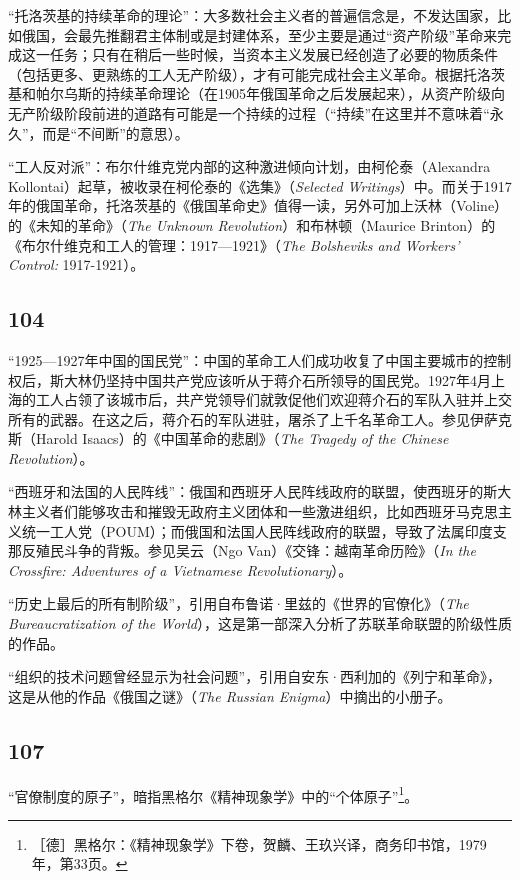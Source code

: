 \documentclass[fontset=fandol, a4paper, 12pt, openright]{ctexbook}
\begin{document}
“托洛茨基的持续革命的理论”：大多数社会主义者的普遍信念是，不发达国家，比如俄国，会最先推翻君主体制或是封建体系，至少主要是通过“资产阶级”革命来完成这一任务；只有在稍后一些时候，当资本主义发展已经创造了必要的物质条件（包括更多、更熟练的工人无产阶级），才有可能完成社会主义革命。根据托洛茨基和帕尔乌斯的持续革命理论（在1905年俄国革命之后发展起来），从资产阶级向无产阶级阶段前进的道路有可能是一个持续的过程（“持续”在这里并不意味着“永久”，而是“不间断”的意思）。

“工人反对派”：布尔什维克党内部的这种激进倾向计划，由柯伦泰（Alexandra Kollontai）起草，被收录在柯伦泰的《选集》（\textit{Selected Writings}）中。而关于1917年的俄国革命，托洛茨基的《俄国革命史》值得一读，另外可加上沃林（Voline）的《未知的革命》（\textit{The Unknown Revolution}）和布林顿（Maurice Brinton）的《布尔什维克和工人的管理：1917—1921》（\textit{The Bolsheviks and Workers' Control:} 1917-1921）。

\subsection*{104}
“1925—1927年中国的国民党”：中国的革命工人们成功收复了中国主要城市的控制权后，斯大林仍坚持中国共产党应该听从于蒋介石所领导的国民党。1927年4月上海的工人占领了该城市后，共产党领导们就敦促他们欢迎蒋介石的军队入驻并上交所有的武器。在这之后，蒋介石的军队进驻，屠杀了上千名革命工人。参见伊萨克斯（Harold Isaacs）的《中国革命的悲剧》（\textit{The Tragedy of the Chinese Revolution}）。

“西班牙和法国的人民阵线”：俄国和西班牙人民阵线政府的联盟，使西班牙的斯大林主义者们能够攻击和摧毁无政府主义团体和一些激进组织，比如西班牙马克思主义统一工人党（POUM）；而俄国和法国人民阵线政府的联盟，导致了法属印度支那反殖民斗争的背叛。参见吴云（Ngo Van）《交锋：越南革命历险》（\textit{In the Crossfire: Adventures of a Vietnamese Revolutionary}）。

“历史上最后的所有制阶级”，引用自布鲁诺·里兹的《世界的官僚化》（\textit{The Bureaucratization of the World}），这是第一部深入分析了苏联革命联盟的阶级性质的作品。

“组织的技术问题曾经显示为社会问题”，引用自安东·西利加的《列宁和革命》，这是从他的作品《俄国之谜》（\textit{The Russian Enigma}）中摘出的小册子。

\subsection*{107}
“官僚制度的原子”，暗指黑格尔《精神现象学》中的“个体原子”\footnote{［德］黑格尔：《精神现象学》下卷，贺麟、王玖兴译，商务印书馆，1979年，第33页。}。
\end{document}
